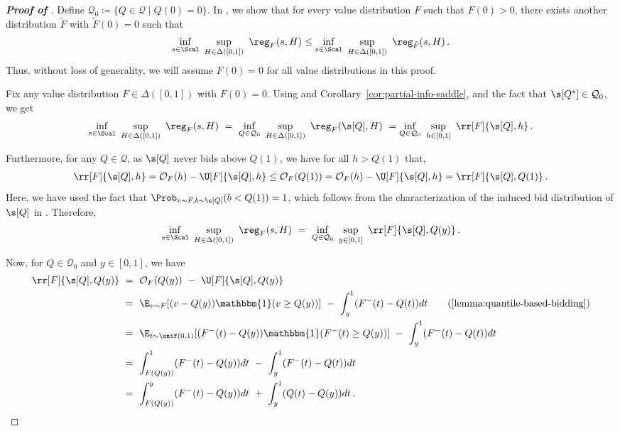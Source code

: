 \begin{proof}[\textbf{Proof of }]
	Define $\mathcal Q_0 \coloneqq \{Q \in \mathcal {Q} \mid Q(0) = 0\}$. In , we show that for every value distribution $F$ such that $F(0)>0$, there exists another distribution $\tilde F$ with $\tilde F(0) = 0$ such that
    \begin{align*}
        \inf_{s \in \Scal}\ \sup_{H \in \Delta([0,1])}\ \reg_F(s,H) \leq \inf_{s \in \Scal}\ \sup_{H \in \Delta([0,1])}\ \reg_{\tilde F}(s,H)\,.
    \end{align*}
    Thus, without loss of generality, we will assume $F(0) = 0$ for all value distributions in this proof.

	Fix any value distribution $F \in \Delta([0,1])$ with $F(0)= 0$. Using  and Corollary~\ref{cor:partial-info-saddle}, and the fact that $\s[Q^*] \in \mathcal{Q}_0$, we get
	\begin{align*}
		\inf_{s \in \Scal}\ \sup_{H \in \Delta([0,1])}\ \reg_F(s,H)\ =\ \inf_{Q \in \mathcal Q_0}\ \sup_{H \in \Delta([0,1])}\ \reg_F(\s[Q],H)\ = \inf_{Q\in \mathcal Q_0}\ \sup_{h \in [0,1]}\ \rr[F]{\s[Q], h}\,.
	\end{align*}
	
	Furthermore, for any $Q \in \mathcal{Q}$, as $\s[Q]$ never bids above $Q(1)$, we have for all $h > Q(1)$ that,
	\begin{align*}
		\rr[F]{\s[Q], h} = \mathcal{O}_{F}(h) - \U[F]{\s[Q], h} \leq \mathcal{O}_{F}(Q(1)) = \mathcal{O}_{F}(h) - \U[F]{\s[Q], h} = \rr[F]{\s[Q], Q(1)}\,.
	\end{align*}
    Here, we have used the fact that $\Prob_{v \sim F, b \sim \s[Q]}(b < Q(1)) = 1$, which follows from the characterization of the induced bid distribution of $\s[Q]$ in . Therefore,
	\begin{align*}
		\inf_{s \in \Scal}\ \sup_{H \in \Delta([0,1])}\ \reg_F(s,H)\ =\ \inf_{Q\in \mathcal Q_0}\ \sup_{y \in [0,1]}\ \rr[F]{\s[Q], Q(y)}\,.
	\end{align*}
	
	Now, for $Q \in \mathcal{Q}_0$ and $y \in [0,1]$, we have
	\begin{align*}
		\rr[F]{\s[Q], Q(y)}\ &=\ \mathcal{O}_{F}(Q(y))\ -\ \U[F]{\s[Q], Q(y)}\\
		&=\ \E_{v \sim F}[(v - Q(y))\mathbbm{1}(v\geq Q(y))]\ -\ \int_y^1 (F^-(t) - Q(t)) dt \tag{\Cref{lemma:quantile-based-bidding}}\\
		&=\ \E_{t \sim \unif(0,1)}[(F^-(t) - Q(y))\mathbbm{1}(F^-(t)\geq Q(y))]\ -\ \int_y^1 (F^-(t) - Q(t)) dt\\
		&=\ \int_{F(Q(y))}^1 (F^-(t) - Q(y)) dt\ -\ \int_y^1 (F^-(t) - Q(t)) dt\\
		&=\ \int_{F(Q(y))}^y (F^-(t) - Q(y)) dt\ +\ \int_y^1 (Q(t) - Q(y)) dt\,.
	\end{align*}
	

\end{proof}
